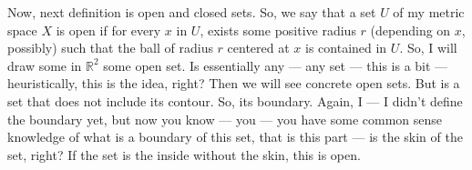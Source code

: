 \begin{math-stroke}
\begin{center}
\end{center}
\end{math-stroke}

\begin{spoken-clean}[00:05:12 - 00:06:15]
Now, next definition is open and closed sets. So, we say that a set $U$ of my metric space $X$ is open if for every $x$ in $U$, exists some positive radius $r$ (depending on $x$, possibly) such that the ball of radius $r$ centered at $x$ is contained in $U$. So, I will draw some in $\mathbb{R}^2$ some open set. Is essentially any --- any set --- this is a bit --- heuristically, this is the idea, right? Then we will see concrete open sets. But is a set that does not include its contour. So, its boundary. Again, I --- I didn't define the boundary yet, but now you know --- you --- you have some common sense knowledge of what is a boundary of this set, that is this part --- is the skin of the set, right? If the set is the inside without the skin, this is open.
\end{spoken-clean}

